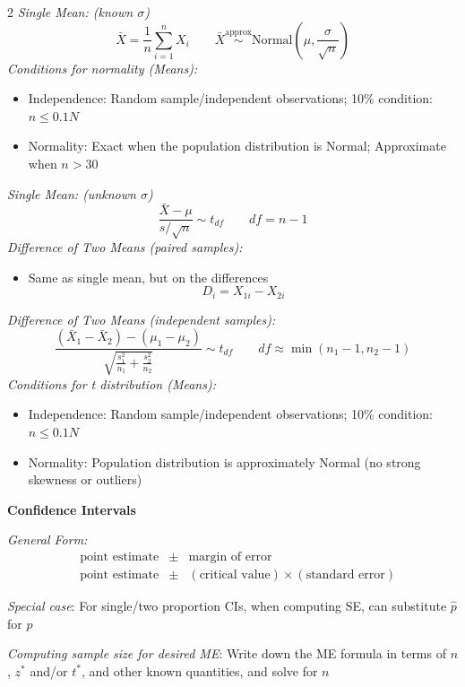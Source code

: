\documentclass[8pt]{article}
\begin{document}
\begin{multicols}{2}
\textit{Single Mean: (known $\sigma$)}
\[\bar{X} = \frac{1}{n} \sum_{i=1}^{n} X_i \qquad \bar{X} \stackrel{\text{approx}}{\sim} \text{Normal}\left(\mu, \frac{\sigma}{\sqrt{n}}\right)\]
\textit{Conditions for normality (Means):}
\begin{itemize} 
    \item Independence: Random sample/independent observations; 10\% condition: $n \leq 0.1N$
    \item Normality: Exact when the population distribution is Normal; Approximate when $n>30$
\end{itemize}
\textit{Single Mean: (unknown $\sigma$)}
\[
    \frac{\bar{X}-\mu}{s/\sqrt{n}} \sim t_{df} \qquad
    df = n - 1
\]
\textit{Difference of Two Means (paired samples):}
\begin{itemize}
    \item Same as single mean, but on the differences \[D_i = X_{1i} - X_{2i}\]
\end{itemize}
\textit{Difference of Two Means (independent samples):}
\[
    \frac{(\bar{X}_1 - \bar{X}_2) - (\mu_1 - \mu_2)}{\sqrt{\frac{s_1^2}{n_1} + \frac{s_2^2}{n_2}}} \sim t_{df} \qquad df \approx \min(n_1 - 1, n_2 - 1)
\]
\textit{Conditions for t distribution (Means):}
\begin{itemize} 
    \item Independence: Random sample/independent observations; 10\% condition: $n \leq 0.1N$
    \item Normality: Population distribution is approximately Normal (no strong skewness or outliers)
\end{itemize}

\textbf{Confidence Intervals}

\textit{General Form:}
\begin{align*}
    &\text{point estimate} &\pm& \text{margin of error} \\
    &\text{point estimate} &\pm& (\text{critical value}) \times (\text{standard error})
\end{align*}

\textit{Special case}: For single/two proportion CIs,  when computing SE, can substitute $\hat{p}$ for $p$

\textit{Computing sample size for desired ME}: Write down the ME formula in terms of $n$, $z^*$ and/or $t^*$, and other known quantities, and solve for $n$

\begin{center}


\end{center}
\end{multicols}
\end{document}
